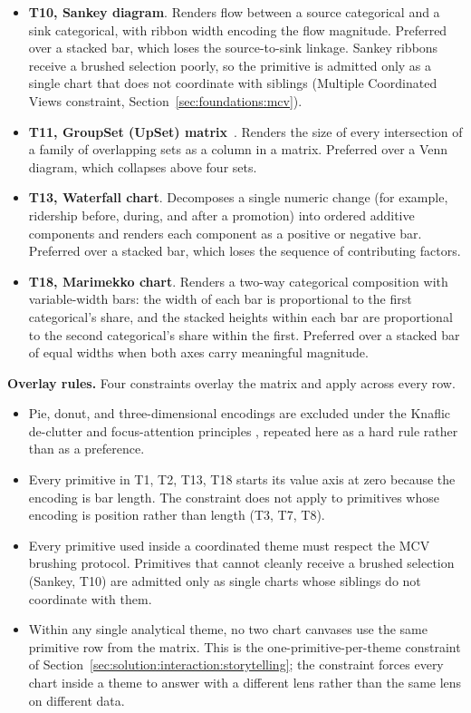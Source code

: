 \begin{itemize}
\item \textbf{T10, Sankey diagram}. Renders flow between a source
categorical and a sink categorical, with ribbon width encoding the
flow magnitude. Preferred over a stacked bar, which loses the
source-to-sink linkage. Sankey ribbons receive a brushed selection
poorly, so the primitive is admitted only as a single chart that
does not coordinate with siblings (Multiple Coordinated Views
constraint, Section~\ref{sec:foundations:mcv}).
\item \textbf{T11, GroupSet (UpSet) matrix}~\cite{lex2014}.
Renders the size of every intersection of a family of overlapping
sets as a column in a matrix. Preferred over a Venn diagram, which
collapses above four sets.
\item \textbf{T13, Waterfall chart}. Decomposes a single numeric
change (for example, ridership before, during, and after a
promotion) into ordered additive components and renders each
component as a positive or negative bar. Preferred over a stacked
bar, which loses the sequence of contributing factors.
\item \textbf{T18, Marimekko chart}. Renders a two-way categorical
composition with variable-width bars: the width of each bar is
proportional to the first categorical's share, and the stacked
heights within each bar are proportional to the second categorical's
share within the first. Preferred over a stacked bar of equal widths
when both axes carry meaningful magnitude.
\end{itemize}

\noindent\textbf{Overlay rules.} Four constraints overlay the matrix and apply across every row.

\begin{itemize}
\item Pie, donut, and three-dimensional encodings are excluded under
the Knaflic de-clutter and focus-attention principles
\cite{knaflic2015}, repeated here as a hard rule rather than as a
preference.
\item Every primitive in T1, T2, T13, T18 starts its value axis at
zero because the encoding is bar length. The constraint does not apply
to primitives whose encoding is position rather than length (T3, T7,
T8).
\item Every primitive used inside a coordinated theme must respect the
MCV brushing protocol. Primitives that cannot cleanly receive a
brushed selection (Sankey, T10) are admitted only as single charts
whose siblings do not coordinate with them.
\item Within any single analytical theme, no two chart canvases use
the same primitive row from the matrix. This is the one-primitive-per-theme constraint of
Section~\ref{sec:solution:interaction:storytelling}; the constraint
forces every chart inside a theme to answer with a different lens
rather than the same lens on different data.
\end{itemize}

